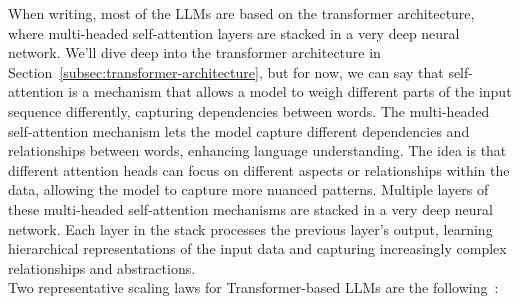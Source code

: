 When writing, most of the LLMs are based on the transformer architecture, where multi-headed self-attention layers are stacked in a very deep neural network.
We'll dive deep into the transformer architecture in Section~\ref{subsec:transformer-architecture}, but for now, we can say that self-attention is a mechanism that allows a model to weigh different parts of the input sequence differently, capturing dependencies between words.
The multi-headed self-attention mechanism lets the model capture different dependencies and relationships between words, enhancing language understanding.
The idea is that different attention heads can focus on different aspects or relationships within the data, allowing the model to capture more nuanced patterns.
Multiple layers of these multi-headed self-attention mechanisms are stacked in a very deep neural network.
Each layer in the stack processes the previous layer's output, learning hierarchical representations of the input data and capturing increasingly complex relationships and abstractions. \\
Two representative scaling laws for Transformer-based LLMs are the following~\cite{kaplan2020scaling, hoffmann2022training}:
